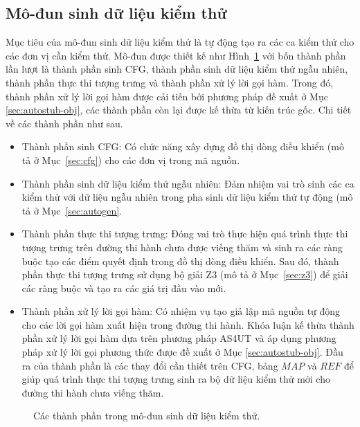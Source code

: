 \subsection{Mô-đun sinh dữ liệu kiểm thử}\label{sec:module-autogen}
Mục tiêu của mô-đun sinh dữ liệu kiểm thử là tự động tạo ra các ca kiểm thử cho các đơn vị cần kiểm thử. Mô-đun được thiết kế như Hình~\ref{fig:module-autogen} với bốn thành phần lần lượt là thành phần sinh CFG, thành phần sinh dữ liệu kiểm thử ngẫu nhiên, thành phần thực thi tượng trưng và thành phần xử lý lời gọi hàm. Trong đó, thành phần xử lý lời gọi hàm được cải tiến bởi phương pháp đề xuất ở Mục \ref{sec:autostub-obj}, các thành phần còn lại được kế thừa từ kiến trúc gốc. Chi tiết về các thành phần như sau.
\begin{itemize}
    \item Thành phần sinh CFG: Có chức năng xây dựng đồ thị dòng điều khiển (mô tả ở Mục~\ref{sec:cfg}) cho các đơn vị trong mã nguồn.
    \item Thành phần sinh dữ liệu kiểm thử ngẫu nhiên: Đảm nhiệm vai trò sinh các ca kiểm thử với dữ liệu ngẫu nhiên trong pha sinh dữ liệu kiểm thử tự động (mô tả ở Mục~\ref{sec:autogen}. 
    \item Thành phần thực thi tượng trưng: Đóng vai trò thực hiện quá trình thực thi tượng trưng trên đường thi hành chưa được viếng thăm và sinh ra các ràng buộc tạo các điểm quyết định trong đồ thị dòng điều khiển. Sau đó, thành phần thực thi tượng trưng sử dụng bộ giải Z3 (mô tả ở Mục~\ref{sec:z3}) để giải các ràng buộc và tạo ra các giá trị đầu vào mới.
    \item Thành phần xử lý lời gọi hàm: Có nhiệm vụ tạo giả lập mã nguồn tự động cho các lời gọi hàm xuất hiện trong đường thi hành. Khóa luận kế thừa thành phần xử lý lời gọi hàm dựa trên phương pháp AS4UT và áp dụng phương pháp xử lý lời gọi phương thức được đề xuất ở Mục \ref{sec:autostub-obj}. Đầu ra của thành phần là các thay đổi cần thiết trên CFG, bảng $MAP$ và $REF$ để giúp quá trình thực thi tượng trưng sinh ra bộ dữ liệu kiểm thử mới cho đường thi hành chưa viếng thăm.
\end{itemize}

\begin{figure}[h]
    \centering
    
    \caption{Các thành phần trong mô-đun sinh dữ liệu kiểm thử.}
    \label{fig:module-autogen}
\end{figure}
%     

